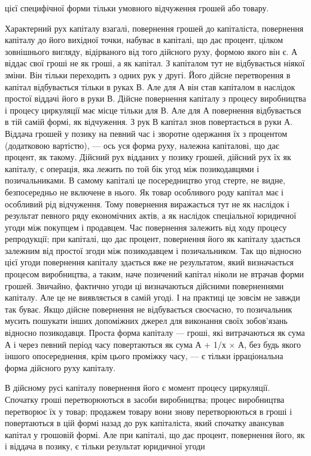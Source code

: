 цієї специфічної форми тільки умовного відчуження грошей
або товару.

Характерний рух капіталу взагалі, повернення грошей до
капіталіста, повернення капіталу до його вихідної точки, набуває
в капіталі, що дає процент, цілком зовнішнього вигляду,
відірваного від того дійсного руху, формою якого він є. А віддає
свої гроші не як гроші, а як капітал. З капіталом тут не
відбувається ніякої зміни. Він тільки переходить з одних рук
у другі. Його дійсне перетворення в капітал відбувається тільки
в руках В. Але для А він став капіталом в наслідок простої
віддачі його в руки В. Дійсне повернення капіталу з процесу
виробництва і процесу циркуляції має місце тільки для В.
Але для А повернення відбувається в тій самій формі, як
відчуження. З рук В капітал знов повертається в руки А. Віддача
грошей у позику на певний час і зворотне одержання їх
з процентом (додатковою вартістю), — ось уся форма руху, належна
капіталові, що дає процент, як такому. Дійсний рух відданих
у позику грошей, дійсний рух їх як капіталу, є операція,
яка лежить по той бік угод між позикодавцями і позичальниками.
В самому капіталі це посередництво угод стерте, не видне, безпосередньо
не включене в нього. Як товар особливого роду
капітал має і особливий рід відчуження. Тому повернення виражається
тут не як наслідок і результат певного ряду економічних
актів, а як наслідок спеціальної юридичної угоди між
покупцем і продавцем. Час повернення залежить від ходу процесу
репродукції; при капіталі, що дає процент, повернення
його як капіталу здається залежним від простої згоди між позикодавцем
і позичальником. Так що відносно цієї угоди повернення
капіталу здається вже не результатом, який визначається процесом
виробництва, а таким, наче позичений капітал ніколи не
втрачав форми грошей. Звичайно, фактично угоди ці визначаються
дійсними поверненнями капіталу. Але це не виявляється
в самій угоді. І на практиці це зовсім не завжди так буває.
Якщо дійсне повернення не відбувається своєчасно, то позичальник
мусить пошукати інших допоміжних джерел для виконання
своїх зобов’язань відносно позикодавця. Проста форма капіталу
— гроші, які витрачаються як сума А і через певний період
часу повертаються як сума А + 1/х × А, без будь якого іншого опосереднення,
крім цього проміжку часу, — є тільки ірраціональна
форма дійсного руху капіталу.

В дійсному русі капіталу повернення його є момент процесу
циркуляції. Спочатку гроші перетворюються в засоби виробництва;
процес виробництва перетворює їх у товар; продажем товару
вони знову перетворюються в гроші і повертаються в цій формі
назад до рук капіталіста, який спочатку авансував капітал у грошовій
формі. Але при капіталі, що дає процент, повернення
його, як і віддача в позику, є тільки результат юридичної угоди
